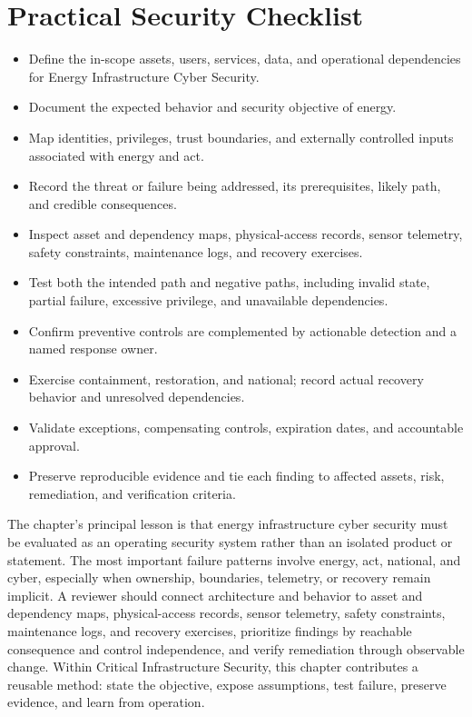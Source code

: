 \documentclass[11pt]{article}
\begin{document}
\section*{Practical Security Checklist}
\begin{itemize}[label=$\square$]
\item Define the in-scope assets, users, services, data, and operational dependencies for Energy Infrastructure Cyber Security.
\item Document the expected behavior and security objective of energy.
\item Map identities, privileges, trust boundaries, and externally controlled inputs associated with energy and act.
\item Record the threat or failure being addressed, its prerequisites, likely path, and credible consequences.
\item Inspect asset and dependency maps, physical-access records, sensor telemetry, safety constraints, maintenance logs, and recovery exercises.
\item Test both the intended path and negative paths, including invalid state, partial failure, excessive privilege, and unavailable dependencies.
\item Confirm preventive controls are complemented by actionable detection and a named response owner.
\item Exercise containment, restoration, and national; record actual recovery behavior and unresolved dependencies.
\item Validate exceptions, compensating controls, expiration dates, and accountable approval.
\item Preserve reproducible evidence and tie each finding to affected assets, risk, remediation, and verification criteria.
\end{itemize}
\begin{synthesisbox}
The chapter's principal lesson is that energy infrastructure cyber security must be evaluated as an operating security system rather than an isolated product or statement. The most important failure patterns involve energy, act, national, and cyber, especially when ownership, boundaries, telemetry, or recovery remain implicit. A reviewer should connect architecture and behavior to asset and dependency maps, physical-access records, sensor telemetry, safety constraints, maintenance logs, and recovery exercises, prioritize findings by reachable consequence and control independence, and verify remediation through observable change. Within Critical Infrastructure Security, this chapter contributes a reusable method: state the objective, expose assumptions, test failure, preserve evidence, and learn from operation.
\end{synthesisbox}
\end{document}
